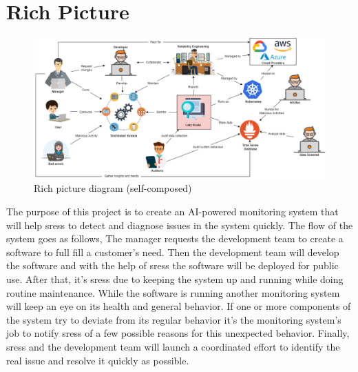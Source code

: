 \section{Rich Picture}

\begin{figure}[H]
    \includegraphics[width=16cm]{assets/requirement-specification/rich-picture.png}
    \caption{Rich picture diagram (self-composed)}
    \label{fig:rich-picture}
\end{figure}

The purpose of this project is to create an AI-powered monitoring system that will help \acp{sres} to detect and diagnose issues in the system quickly. The flow of the system goes as follows, The manager requests the development team to create a software to full fill a customer's need. Then the development team will develop the software and with the help of \acp{sres} the software will be deployed for public use. After that, it's \acp{sres} due to keeping the system up and running while doing routine maintenance. While the software is running another monitoring system will keep an eye on its health and general behavior. If one or more components of the system try to deviate from its regular behavior it's the monitoring system's job to notify \acp{sres} of a few possible reasons for this unexpected behavior. Finally, \acp{sres} and the development team will launch a coordinated effort to identify the real issue and resolve it quickly as possible. 